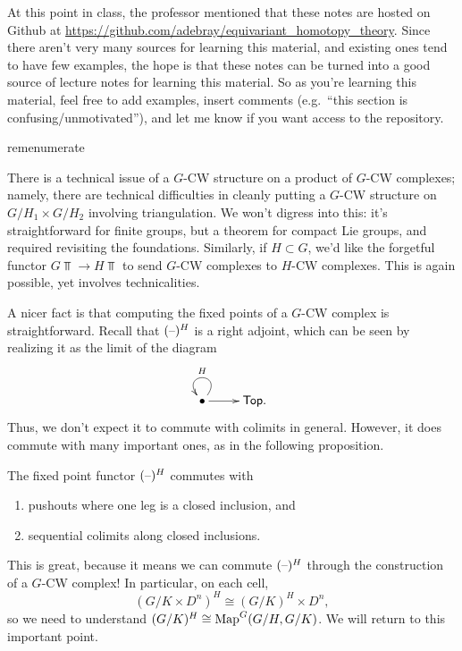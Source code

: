 \begin{rem}
At this point in class, the professor mentioned that these notes are hosted on Github at
\url{https://github.com/adebray/equivariant_homotopy_theory}. Since there aren't very many sources for learning
this material, and existing ones tend to have few examples, the hope is that these notes can be turned into a good
source of lecture notes for learning this material. So as you're learning this material, feel free to add
examples, insert comments (e.g.\ ``this section is confusing/unmotivated''), and let me know if you want access to
the repository.
\end{rem}
\begin{comp}{rem}{enumerate}
	\item There is a technical issue of a $G$-CW structure on a product of $G$-CW complexes; namely, there are
	technical difficulties in cleanly putting a $G$-CW structure on $G/H_1\times G/H_2$ involving triangulation.
	We won't digress into this: it's straightforward for finite groups, but a theorem for compact Lie groups, and
	required revisiting the foundations. Similarly, if $H\subset G$, we'd like the forgetful functor $G\Top\to
	H\Top$ to send $G$-CW complexes to $H$-CW complexes. This is again possible, yet involves technicalities.
	\item A nicer fact is that computing the fixed points of a $G$-CW complex is straightforward. Recall that
	$(\text{--})^H$ is a right adjoint, which can be seen by realizing it as the limit of the diagram
	\[\xymatrix{
		\bullet\ar@(ur, ul)_H\ar[r] & \Top.
	}\]
	Thus, we don't expect it to commute with colimits in general. However, it does commute with many important
	ones, as in the following proposition.\qedhere
\end{comp}
\begin{prop}
The fixed point functor $(\text{--})^H$ commutes with
\begin{enumerate}
	\item pushouts where one leg is a closed inclusion, and
	\item sequential colimits along closed inclusions.
\end{enumerate}
\end{prop}
This is great, because it means we can commute $(\text{--})^H$ through the construction of a $G$-CW complex! In
particular, on each cell,
\[(G/K\times D^n)^H\cong (G/K)^H\times D^n,\]
so we need to understand $(G/K)^H\cong\operatorname{Map}^G(G/H,G/K)$. We will return to this important point.
